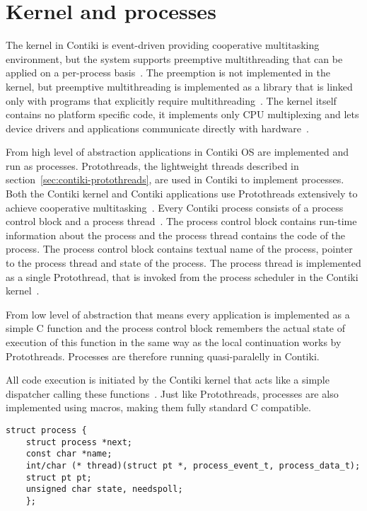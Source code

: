 
\section{Kernel and processes}
The kernel in Contiki is event-driven providing cooperative multitasking
environment, but the system supports preemptive
multithreading that can be applied on a per-process basis~\cite{video}.
The preemption is not implemented in the kernel, but
preemptive multithreading is implemented as a library that is linked only with programs that
explicitly require multithreading~\cite{paper-contiki}.
The kernel itself contains no platform specific code, it implements only CPU multiplexing and
lets device drivers and applications communicate directly with hardware~\cite{video}.

From high level of abstraction
applications in Contiki OS are implemented and run as processes.
Protothreads, the lightweight threads described in section~\ref{sec:contiki-protothreads},
are used in Contiki to implement processes.
Both the Contiki kernel and Contiki applications use
Protothreads extensively to achieve cooperative multitasking~\cite{contiki-wiki-faq}.
Every Contiki process consists of a process control block and a process thread~\cite{contiki-wiki-processes}.
The process control block contains run-time information about the process and
the process thread contains the code of the process.
The process control block contains
textual name of the process, pointer to the process thread and state of the process.
The process thread is implemented as a single Protothread,
that is invoked from the process scheduler in the Contiki kernel~\cite{contiki-wiki-processes}.

From low level of abstraction that means
every application is implemented as a simple C function
and the process control block remembers the actual state of execution of this function
in the same way as the local continuation works by Protothreads.
Processes are therefore running quasi-paralelly in Contiki.

All code execution is initiated by the Contiki kernel
that acts like a simple dispatcher calling these functions~\cite{contiki-docs}.
Just like Protothreads, processes are also implemented using macros,
making them fully standard C compatible.
\begin{lstlisting}
struct process {
	struct process *next;
	const char *name;
	int/char (* thread)(struct pt *, process_event_t, process_data_t);
	struct pt pt;
	unsigned char state, needspoll;
	};
\end{lstlisting}

